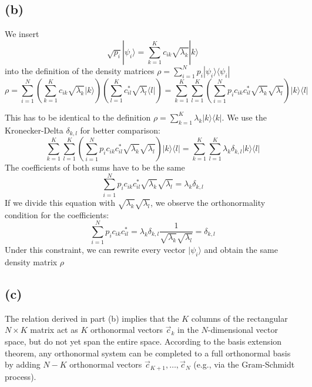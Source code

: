 \documentclass{article}
\begin{document}
\subsection*{(b)}
We insert
\begin{equation}
    \sqrt{p_i} |\psi_i\rangle = \sum_{k=1}^K c_{ik} \sqrt{\lambda_{ k}}  |k\rangle
\end{equation}
into the definition of the density matrices $\rho = \sum_{i=1}^N p_i |\psi_i\rangle \langle \psi_i|$
\begin{equation}
    \rho = \sum_{i=1}^N \left( \sum_{k=1}^K c_{ik} \sqrt{\lambda_{ k}} |k\rangle \right) \left( \sum_{l=1}^K c_{il}^* \sqrt{\lambda_{l}}  \langle l| \right) = \sum_{k=1}^K \sum_{l=1}^K \left( \sum_{i=1}^N p_i c_{ik} c_{il}^* \sqrt{\lambda_{ k}}  \sqrt{\lambda_{ l}}  \right) |k\rangle \langle l|
\end{equation}

This has to be identical to the definition $\rho = \sum_{k=1}^K \lambda_{ k}  |k\rangle \langle k|$. We use the Kronecker-Delta $\delta_{k,l}$ for better comparison:
\begin{equation}
    \sum_{k=1}^K \sum_{l=1}^K \left( \sum_{i=1}^N p_i c_{ik} c_{il}^* \sqrt{\lambda_{ k}}  \sqrt{\lambda_{ l}}  \right) |k\rangle \langle l| = \sum_{k=1}^K \sum_{l=1}^K \lambda_{ k} \delta_{k,l} |k\rangle \langle l|
\end{equation}
The coefficients of both sums have to be the same
\begin{equation}
    \sum_{i=1}^N p_i c_{ik} c_{il}^* \sqrt{\lambda_{ k}}  \sqrt{\lambda_{ l}}  = \lambda_k \delta_{k,l}
\end{equation}
If we divide this equation with $\sqrt{\lambda_{ k}} \sqrt{\lambda_{ l}}$, we observe the orthonormality condition for the coefficients:
\begin{equation}
    \sum_{i=1}^N p_i c_{ik} c_{il}^*  = \lambda_k \delta_{k,l} \frac{1}{\sqrt{\lambda_{ k}} \sqrt{\lambda_{ l}}} = \delta_{k,l}
\end{equation}
Under this constraint, we can rewrite every vector $|\psi_i\rangle$ and obtain the same density matrix $\rho$
\subsection*{(c)}
The relation derived in part (b) implies that the $K$ columns of the rectangular $N \times K$ matrix act as $K$ orthonormal vectors $\vec{c}_k$ in the $N$-dimensional vector space, but do not yet span the entire space.
According to the basis extension theorem, any orthonormal system can be completed to a full orthonormal basis by adding $N-K$ orthonormal vectors $\vec{c}_{K+1}, \dots, \vec{c}_N$ (e.g., via the Gram-Schmidt process).
\end{document}
